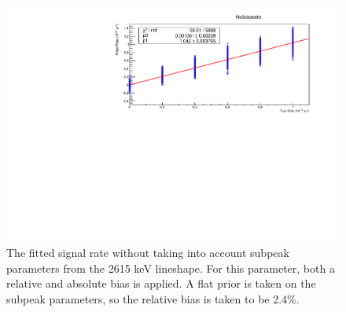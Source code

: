 \begin{figure}
\centering
\includegraphics[width=0.7\linewidth]{Figures/Appendix_Figures/NoSubpeaks.pdf}
\caption[The fitted signal rate without taking into account subpeak parameters from the 2615 keV lineshape.]
{The fitted signal rate without taking into account subpeak parameters from the 2615 keV lineshape.
For this parameter, both a relative and absolute bias is applied.
A flat prior is taken on the subpeak parameters, so the relative bias is taken to be 2.4\%.}
\label{fig:nosubpeaks}
\end{figure}